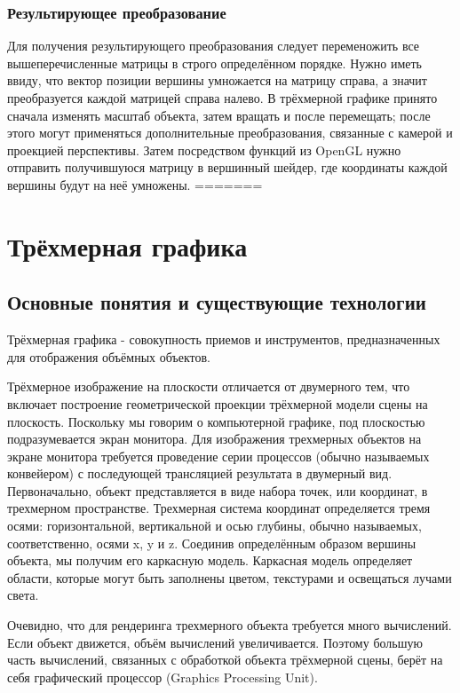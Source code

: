     \subsection{Результирующее преобразование}
Для получения результирующего преобразования следует переменожить все вышеперечисленные матрицы 
в строго определённом порядке. Нужно иметь ввиду, что вектор позиции вершины умножается на матрицу справа, 
а значит преобразуется каждой матрицей справа налево. В трёхмерной графике принято сначала изменять масштаб объекта, 
затем вращать и после перемещать; после этого могут применяться дополнительные преобразования, связанные с камерой 
и проекцией перспективы. Затем посредством функций из OpenGL нужно отправить получившуюся 
матрицу в вершинный шейдер, где координаты каждой вершины будут на неё умножены.
=======
\chapter{Трёхмерная графика}
\section{Основные понятия и существующие технологии}
Трёхмерная графика - совокупность приемов и инструментов, предназначенных для отображения объёмных объектов.


Трёхмерное изображение на плоскости отличается от двумерного тем, что включает построение 
геометрической проекции трёхмерной модели сцены на плоскость. Поскольку мы говорим 
о компьютерной графике, под плоскостью подразумевается экран монитора.
Для изображения трехмерных объектов на экране монитора требуется проведение серии процессов 
(обычно называемых конвейером) с последующей трансляцией результата в двумерный вид. 
Первоначально, объект представляется в виде набора точек, или координат, в трехмерном пространстве. 
Трехмерная система координат определяется тремя осями: горизонтальной, вертикальной и осью глубины, 
обычно называемых, соответственно, осями x, y и z. Соединив определённым образом вершины объекта, 
мы получим его каркасную модель. Каркасная модель определяет области, 
которые могут быть заполнены цветом, текстурами и освещаться лучами света.


Очевидно, что для рендеринга трехмерного объекта требуется много вычислений. Если объект движется, 
объём вычислений увеличивается. Поэтому большую часть вычислений, связанных 
с обработкой объекта трёхмерной сцены, берёт на себя графический процессор (Graphics Processing Unit).



